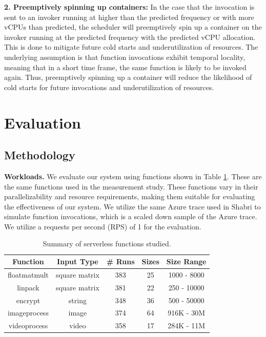 \documentclass[times, 10pt,twocolumn]{article}
\begin{document}
\textbf{2. Preemptively spinning up containers: } In the case that the invocation is sent to an invoker running at higher than the predicted frequency or with more vCPUs than predicted, the scheduler will preemptively spin up a container on the invoker running at the predicted frequency with the predicted vCPU allocation. This is done to mitigate future cold starts and underutilization of resources. The underlying assumption is that function invocations exhibit temporal locality, meaning that in a short time frame, the same function is likely to be invoked again. Thus, preemptively spinning up a container will reduce the likelihood of cold starts for future invocations and underutilization of resources.

\section{Evaluation}

\subsection{Methodology}
\textbf{Workloads.} We evaluate our system using functions shown in Table \ref{tab:summary_of_serverless_functions}. These are the same functions used in the measurement study. These functions vary in their parallelizability and resource requirements, making them suitable for evaluating the effectiveness of our system. We utilize the same Azure trace used in Shabri \cite{sinha2024shabari} to simulate function invocations, which is a scaled down sample of the Azure trace. We utilize a requests per second (RPS) of 1 for the evaluation.

\begin{table}[htbp]
  \centering
  \begin{tabular}{|c|c|c|c|c|}
  \hline
  \textbf{Function} & \textbf{Input Type} & \textbf{\# Runs} & \textbf{Sizes} & \textbf{Size Range} \\ \hline
  floatmatmult & square matrix & 383 & 25 & 1000 - 8000 \\ \hline
  linpack & square matrix & 381 & 22 & 250 - 10000 \\ \hline
  encrypt & string & 348 & 36 & 500 - 50000 \\ \hline
  imageprocess & image & 374 & 64 & 916K - 30M \\ \hline
  videoprocess & video & 358 & 17 & 284K - 11M \\ \hline
  \end{tabular}
  \caption{Summary of serverless functions studied.}
  \label{tab:summary_of_serverless_functions}
\end{table}
\end{document}
